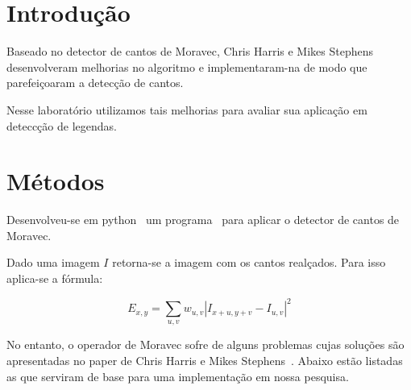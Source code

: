 \documentclass[10pt,a4paper]{article}
\begin{document}
\vspace{2mm}
\newpage

\section{Introdução}

Baseado no detector de cantos de Moravec, Chris Harris e
Mikes Stephens~\cite{paper} desenvolveram melhorias no algoritmo e
implementaram-na de modo que parefeiçoaram a detecção de cantos.

Nesse laboratório utilizamos tais melhorias para avaliar sua aplicação
em deteccção de legendas.
\section{Métodos}

Desenvolveu-se em python~\cite{python} um programa~\cite{code} para aplicar o
detector de cantos de Moravec.

Dado uma imagem $I$ retorna-se a imagem com os cantos realçados.
Para isso aplica-se a fórmula:

\begin{equation}
E_{x,y}=\sum_{u,v}w_{u,v}\left | I_{x+u,y+v}-I_{u,v}  \right |^2
\end{equation}

No entanto, o operador de Moravec sofre de alguns problemas cujas soluções são apresentadas no paper de  Chris Harris e
Mikes Stephens~\cite{paper}. Abaixo estão listadas as que serviram de
base para uma implementação  em
nossa pesquisa. 
\end{document}
